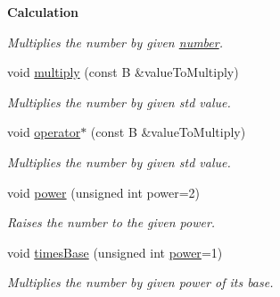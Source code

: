 \begin{Indent}{\bf Calculation}
\begin{DoxyCompactItemize}
\begin{DoxyCompactList}\small\item\em Multiplies the number by given \hyperlink{classcjr_1_1number}{number}. \end{DoxyCompactList}\item 
void \hyperlink{classcjr_1_1number_aea945b8aecaad22c99b954bea3af1179}{multiply} (const B \&value\-To\-Multiply)
\begin{DoxyCompactList}\small\item\em Multiplies the number by given std value. \end{DoxyCompactList}\item 
\hypertarget{classcjr_1_1number_af665bf47c1d23104effdda477a173ba2}{void \hyperlink{classcjr_1_1number_af665bf47c1d23104effdda477a173ba2}{operator$\ast$} (const B \&value\-To\-Multiply)}\label{classcjr_1_1number_af665bf47c1d23104effdda477a173ba2}

\begin{DoxyCompactList}\small\item\em Multiplies the number by given std value. \end{DoxyCompactList}\item 
void \hyperlink{classcjr_1_1number_ace65049054fa8b2a7498a3f2af7b7298}{power} (unsigned int power=2)
\begin{DoxyCompactList}\small\item\em Raises the number to the given power. \end{DoxyCompactList}\item 
void \hyperlink{classcjr_1_1number_a5f2aeb5b369b048c53e2a0c209a5476e}{times\-Base} (unsigned int \hyperlink{classcjr_1_1number_ace65049054fa8b2a7498a3f2af7b7298}{power}=1)
\begin{DoxyCompactList}\small\item\em Multiplies the number by given power of its base. \end{DoxyCompactList}\end{DoxyCompactItemize}
\end{Indent}

